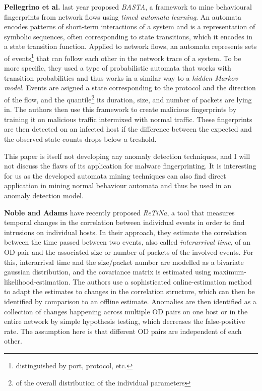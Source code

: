 \documentclass[a4paper,12pt,twoside]{report}
\begin{document}
\textbf{Pellegrino et al.} \cite{pellegrino2017learning} last year proposed \textit{BASTA}, a framework to mine behavioural fingerprints from network flows using \textit{timed automata learning}. An automata encodes patterns of short-term interactions of a system and is a representation of symbolic sequences, often corresponding to state transitions, which it encodes in a state transition function. Applied to network flows, an automata represents sets of events\footnote{distinguished by port,  protocol, etc.} that can follow each other in the network trace of a system. To be more specific, they used a type of probabilistic automata that works with transition probabilities and thus works in a similar way to a \textit{hidden Markov model}. Events are asigned a state corresponding to the protocol and the direction of the flow, and the quantile\footnote{of the overall distribution of the individual parameters} its duration, size, and number of packets are lying in. The authors then use this framework to create malicious fingerprints by training it on malicious traffic intermixed with normal traffic. These fingerprints are then detected on an infected host if the difference between the expected and the observed state counts drops below a treshold. 

This paper is itself not developing any anomaly detection techniques, and I will not discuss the flaws of its application for malware fingerprinting. It is interesting for us as the developed automata mining techniques can also find direct application in mining normal behaviour automata and thus be used in an anomaly detection model. 


\textbf{Noble and Adams} \cite{noble_real-time_2018, noble_correlation-based_2016} have recently proposed \textit{ReTiNa}, a tool that measures temporal changes in the correlation between individual events in order to find intrusions on individual hosts. In their approach, they estimate the correlation between the time passed between two events, also called \textit{interarrival time}, of an OD pair and the associated size or number of packets of the involved events. For this, interarrival time and the size/packet number are modelled as a bivariate gaussian distribution, and the covariance matrix is estimated using maximum-likelihood-estimation. The authors use a sophisticated online-estimation method to adapt the estimates to changes in the correlation structure, which can then be identified by comparison to an offline estimate. Anomalies are then identified as a collection of changes happening across multiple OD pairs on one host or in the entire network by simple hypothesis testing, which decreases the false-positive rate. The assumption here is that different OD pairs are independent of each other.
\end{document}
